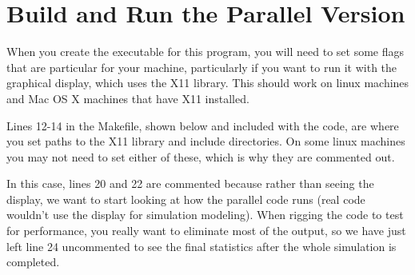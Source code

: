 \documentclass[letterpaper,10pt,openany,oneside]{sphinxmanual}
\begin{document}
\chapter{Build and Run the Parallel Version}
\label{8.1-ompBuildAndRun/omp_build::doc}\label{8.1-ompBuildAndRun/omp_build:build-and-run-the-parallel-version}
When you create the executable for this program, you will need to set some flags that are particular for your machine, particularly if you want to run it with the graphical display, which uses the X11 library.  This should work on linux machines and Mac OS X machines that have X11 installed.

Lines 12-14 in the Makefile, shown below and included with the code, are where you set paths to the X11 library and include directories.  On some linux machines you may not need to set either of these, which is why they are commented out.

In this case, lines 20 and 22 are commented because rather than seeing the display, we want to start looking at how the parallel code runs (real code wouldn't use the display for simulation modeling).  When rigging the code to test for performance, you really want to eliminate most of the output, so we have just left line 24 uncommented to see the final statistics after the whole simulation is completed.
\end{document}
